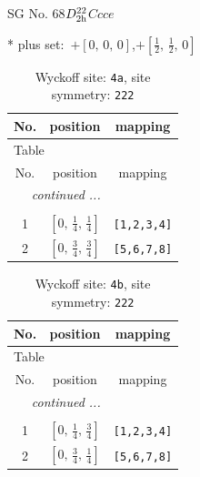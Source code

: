 \documentclass[fleqn,8pt]{jsarticle}
\begin{document}
\setcounter{MaxMatrixCols}{32}

\renewcommand{\tablename}{Table~}
\renewcommand{\figurename}{Figure~}
\begin{center}
\LARGE
SG No. 68\quad$D_{\rm 2h}^{22}$\quad$Ccce$\quad[ orthorhombic ]
\end{center}
* plus set:\,\,\,$+\left[ 0,\, 0,\, 0 \right]$,\quad $+\left[ \frac{1}{2},\, \frac{1}{2},\, 0 \right]$
\renewcommand{\arraystretch}{1.2}
\begin{longtable}{ccc}
\caption{Wyckoff site: {\tt 4a}, site symmetry: {\tt 222}}
 \\
 \hline \hline
No. & position & mapping \\ \hline \endfirsthead

\multicolumn{2}{l}{\tablename\ \thetable{}} \\
 \hline \hline
No. & position & mapping \\ \hline \endhead

 \hline \hline
\multicolumn{2}{r}{\footnotesize\it continued ...} \\ \endfoot

 \hline \hline
\multicolumn{2}{r}{} \\ \endlastfoot

1 & $\left[ 0,\, \frac{1}{4},\, \frac{1}{4} \right]$ & {\tt [1,2,3,4]} \\ \hline
2 & $\left[ 0,\, \frac{3}{4},\, \frac{3}{4} \right]$ & {\tt [5,6,7,8]} \\
\end{longtable}
\renewcommand{\arraystretch}{1.2}
\begin{longtable}{ccc}
\caption{Wyckoff site: {\tt 4b}, site symmetry: {\tt 222}}
 \\
 \hline \hline
No. & position & mapping \\ \hline \endfirsthead

\multicolumn{2}{l}{\tablename\ \thetable{}} \\
 \hline \hline
No. & position & mapping \\ \hline \endhead

 \hline \hline
\multicolumn{2}{r}{\footnotesize\it continued ...} \\ \endfoot

 \hline \hline
\multicolumn{2}{r}{} \\ \endlastfoot

1 & $\left[ 0,\, \frac{1}{4},\, \frac{3}{4} \right]$ & {\tt [1,2,3,4]} \\ \hline
2 & $\left[ 0,\, \frac{3}{4},\, \frac{1}{4} \right]$ & {\tt [5,6,7,8]} \\
\end{longtable}
\end{document}
